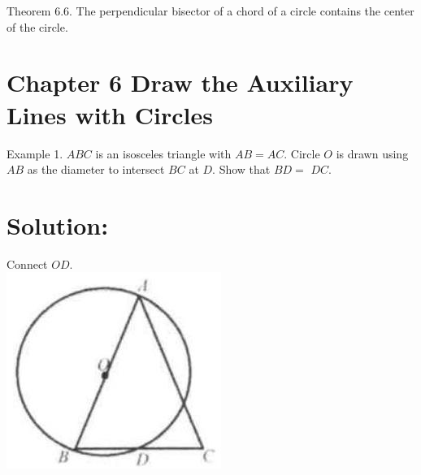 \documentclass[10pt]{article}
\begin{document}
Theorem 6.6. The perpendicular bisector of a chord of a circle contains the center of the circle.

\section*{Chapter 6 Draw the Auxiliary Lines with Circles}
Example 1. \(A B C\) is an isosceles triangle with \(A B=A C\). Circle \(O\) is drawn using \(A B\) as the diameter to intersect \(B C\) at \(D\). Show that \(B D=\) \(D C\).

\section*{Solution:}
Connect \(O D\).\\
\includegraphics[max width=\textwidth, center]{2025_04_17_97bc1f7e44d93c271a88g-147(2)}
\end{document}
